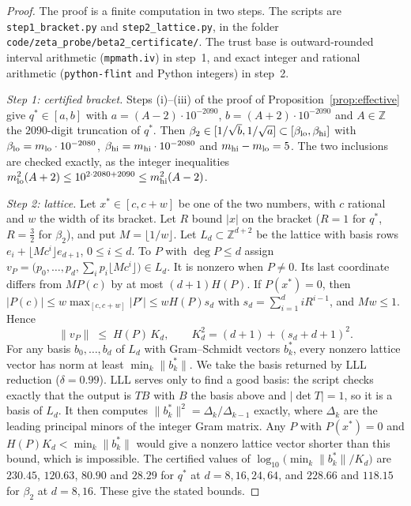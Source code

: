 \documentclass[11pt]{article}
\theoremstyle{plain}
\theoremstyle{definition}
\theoremstyle{remark}
\newcommand{\Z}{\mathbb{Z}}
\begin{document}
\begin{proof}
The proof is a finite computation in two steps. The scripts are \texttt{step1\_bracket.py} and
\texttt{step2\_lattice.py}, in the folder
\texttt{code/\allowbreak zeta\_probe/\allowbreak beta2\_certificate/}. The trust base is
outward-rounded interval arithmetic (\texttt{mpmath.iv}) in step~1, and exact integer and rational
arithmetic (\texttt{python-flint} and Python integers) in step~2.

\emph{Step 1: certified bracket.} Steps \textup{(i)}--\textup{(iii)} of the proof of
Proposition~\ref{prop:effective} give $q^\ast\in[a,b]$ with $a=(A-2)\cdot10^{-2090}$,
$b=(A+2)\cdot10^{-2090}$ and $A\in\Z$ the $2090$-digit truncation of $q^\ast$. Then
$\beta_2\in[1/\sqrt b,1/\sqrt a]\subset[\beta_{\rm lo},\beta_{\rm hi}]$ with
$\beta_{\rm lo}=m_{\rm lo}\cdot10^{-2080}$, $\beta_{\rm hi}=m_{\rm hi}\cdot10^{-2080}$ and
$m_{\rm hi}-m_{\rm lo}=5$. The two inclusions are checked exactly, as the integer inequalities
$m_{\rm lo}^2(A+2)\le10^{2\cdot2080+2090}\le m_{\rm hi}^2(A-2)$.

\emph{Step 2: lattice.} Let $x^\ast\in[c,c+w]$ be one of the two numbers, with $c$ rational and $w$
the width of its bracket. Let $R$ bound $|x|$ on the bracket ($R=1$ for $q^\ast$, $R=\tfrac32$ for
$\beta_2$), and put $M=\lfloor1/w\rfloor$. Let $L_d\subset\Z^{d+2}$ be the lattice with basis rows
$e_i+\lfloor Mc^i\rfloor e_{d+1}$, $0\le i\le d$. To $P$ with $\deg P\le d$ assign
$v_P=\bigl(p_0,\dots,p_d,\sum_ip_i\lfloor Mc^i\rfloor\bigr)\in L_d$. It is nonzero when $P\ne0$. Its
last coordinate differs from $MP(c)$ by at most $(d+1)H(P)$. If $P(x^\ast)=0$, then
$|P(c)|\le w\max_{[c,c+w]}|P'|\le wH(P)s_d$ with $s_d=\sum_{i=1}^diR^{i-1}$, and $Mw\le1$. Hence
\[
   \|v_P\|\;\le\;H(P)\,K_d,\qquad K_d^2=(d+1)+(s_d+d+1)^2 .
\]
For any basis $b_0,\dots,b_d$ of $L_d$ with Gram--Schmidt vectors $b_k^\ast$, every nonzero lattice
vector has norm at least $\min_k\|b_k^\ast\|$. We take the basis returned by LLL reduction
($\delta=0.99$). LLL serves only to find a good basis: the script checks exactly that the output is
$TB$ with $B$ the basis above and $|\det T|=1$, so it is a basis of $L_d$. It then computes
$\|b_k^\ast\|^2=\Delta_k/\Delta_{k-1}$ exactly, where $\Delta_k$ are the leading principal minors of
the integer Gram matrix. Any $P$ with $P(x^\ast)=0$ and $H(P)K_d<\min_k\|b_k^\ast\|$ would give a
nonzero lattice vector shorter than this bound, which is impossible. The certified values of
$\log_{10}\bigl(\min_k\|b_k^\ast\|/K_d\bigr)$ are $230.45$, $120.63$, $80.90$ and $28.29$ for $q^\ast$
at $d=8,16,24,64$, and $228.66$ and $118.15$ for $\beta_2$ at $d=8,16$. These give the stated bounds.
\end{proof}
\end{document}
